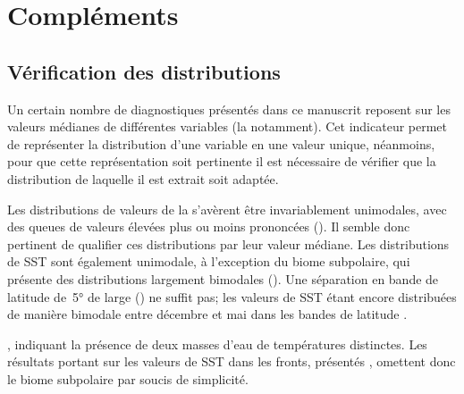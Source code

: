 \insertArticle{}

\section{Compléments}
\label{sec:complements-chl}
\suppressfloats[t]

\subsection{Vérification des distributions}
\label{sec:verif-hist}

Un certain nombre de diagnostiques présentés dans ce manuscrit reposent sur les valeurs médianes de différentes variables (la  notamment).
Cet indicateur permet de représenter la distribution d'une variable en une valeur unique, néanmoins, pour que cette représentation soit pertinente il est nécessaire de vérifier que la distribution de laquelle il est extrait soit adaptée.

Les distributions de valeurs de la  s'avèrent être invariablement unimodales, avec des queues de valeurs élevées plus ou moins prononcées ().
Il semble donc pertinent de qualifier ces distributions par leur valeur médiane.
Les distributions de SST sont également unimodale, à l'exception du biome subpolaire, qui présente des distributions largement bimodales ().
Une séparation en bande de latitude de~\ang{5} de large () ne suffit pas; les valeurs de SST étant encore distribuées de manière bimodale entre décembre et mai dans les bandes de latitude .

, indiquant la présence de deux masses d'eau de températures distinctes.
Les résultats portant sur les valeurs de SST dans les fronts, présentés , omettent donc le biome subpolaire par soucis de simplicité.

\begin{figure}
  \centering
  \label{fig:verif-hist}
\end{figure}

